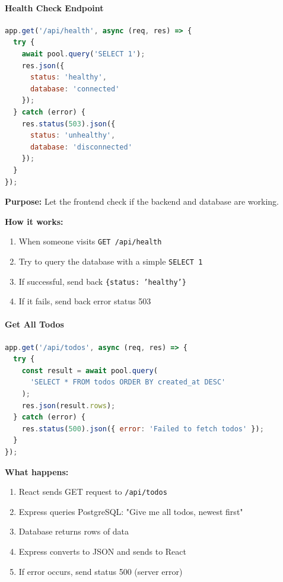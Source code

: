 \documentclass[12pt,a4paper]{article}
\begin{document}
\paragraph{Health Check Endpoint}

\begin{lstlisting}[language=JavaScript, caption=Health Check]
app.get('/api/health', async (req, res) => {
  try {
    await pool.query('SELECT 1');
    res.json({ 
      status: 'healthy',
      database: 'connected'
    });
  } catch (error) {
    res.status(503).json({ 
      status: 'unhealthy',
      database: 'disconnected'
    });
  }
});
\end{lstlisting}

\textbf{Purpose:} Let the frontend check if the backend and database are working.

\textbf{How it works:}
\begin{enumerate}
    \item When someone visits \texttt{GET /api/health}
    \item Try to query the database with a simple \texttt{SELECT 1}
    \item If successful, send back \texttt{\{status: 'healthy'\}}
    \item If it fails, send back error status 503
\end{enumerate}

\paragraph{Get All Todos}

\begin{lstlisting}[language=JavaScript, caption=GET All Todos]
app.get('/api/todos', async (req, res) => {
  try {
    const result = await pool.query(
      'SELECT * FROM todos ORDER BY created_at DESC'
    );
    res.json(result.rows);
  } catch (error) {
    res.status(500).json({ error: 'Failed to fetch todos' });
  }
});
\end{lstlisting}

\textbf{What happens:}
\begin{enumerate}
    \item React sends GET request to \texttt{/api/todos}
    \item Express queries PostgreSQL: "Give me all todos, newest first"
    \item Database returns rows of data
    \item Express converts to JSON and sends to React
    \item If error occurs, send status 500 (server error)
\end{enumerate}
\end{document}
